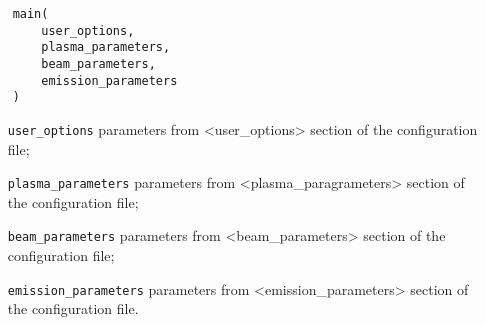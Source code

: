 \documentclass[../../main]{subfiles}
\begin{document}
\begin{verbatim}
    main(
        user_options,
        plasma_parameters,
        beam_parameters,
        emission_parameters
    )
\end{verbatim}

\begin{itemize}[align=left]
    \item[\texttt{user\_options}] parameters from <user\_options> section of the configuration file;
    \item[\texttt{plasma\_parameters}] parameters from <plasma\_paragrameters> section of the configuration file;
    \item[\texttt{beam\_parameters}] parameters from <beam\_parameters> section of the configuration file;
    \item[\texttt{emission\_parameters}] parameters from <emission\_parameters> section of the configuration file.
\end{itemize}
\end{document}

